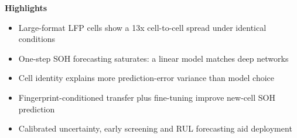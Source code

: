 \documentclass[12pt]{article}
\begin{document}
\begin{center}\textbf{Highlights}\end{center}
\begin{itemize}
\item Large-format LFP cells show a 13x cell-to-cell spread under identical conditions
\item One-step SOH forecasting saturates: a linear model matches deep networks
\item Cell identity explains more prediction-error variance than model choice
\item Fingerprint-conditioned transfer plus fine-tuning improve new-cell SOH prediction
\item Calibrated uncertainty, early screening and RUL forecasting aid deployment
\end{itemize}
\end{document}
